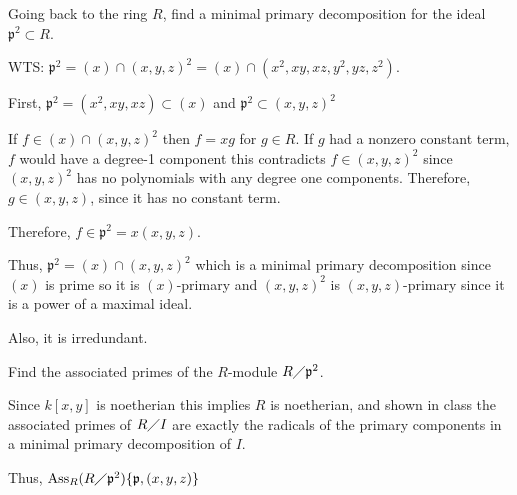\documentclass[12pt, letterpaper]{article}
\newcommand{\p}{\mathfrak{p}}
\newcommand{\Ass}{\mathrm{Ass}}
\begin{document}
\begin{subproblem}{}
    Going back to the ring $R$, find a minimal primary decomposition for the ideal $\p^2 \subset R$.
\end{subproblem}
\begin{problemproof}
    WTS: $\p^2 = (x) \cap (x,y,z)^2 = (x) \cap (x^2,xy,xz,y^2,yz,z^2)$.

    First, $\p^2=(x^2,xy,xz) \subset (x)$ and $\p^2 \subset (x,y,z)^2$

    If $f \in (x) \cap (x,y,z)^2$ then $f=xg$ for $g \in R$. If $g$ had a nonzero constant term, $f$ would have a degree-1 component this contradicts $f \in (x,y,z)^2$ since $(x,y,z)^2$ has no polynomials with any degree one components. Therefore, $g \in (x,y,z)$, since it has no constant term.

    Therefore, $f \in \p^2 = x(x,y,z)$.

    Thus, $\p^2 = (x) \cap (x,y,z)^2$ which is a minimal primary decomposition since $(x)$ is prime so it is $(x)$-primary and $(x,y,z)^2$ is $(x,y,z)$-primary since it is a power of a maximal ideal.

    Also, it is irredundant.
\end{problemproof}

\begin{subproblem}{}
    Find the associated primes of the $R$-module $R \diagup \p^2$.
\end{subproblem}
\begin{problemproof}
    Since $k[x,y]$ is noetherian this implies $R$ is noetherian, and shown in class the associated primes of $R \diagup I$ are exactly the radicals of the primary components in a minimal primary decomposition of $I$.

    Thus, $\Ass_R(R \diagup \p^2)  \{\p, (x,y,z)\}$
\end{problemproof}
\end{document}
